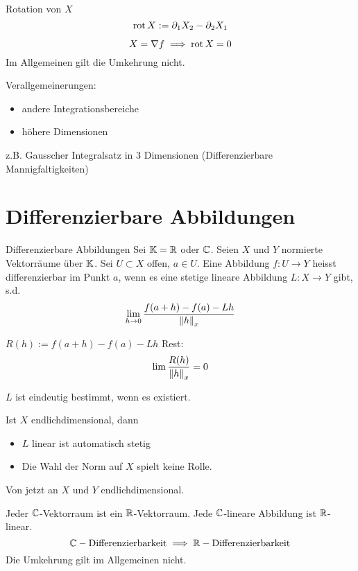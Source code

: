 \begin{Def}{Rotation von $X$}
  \[\operatorname{rot} X:=\partial_1X_2-\partial_2X_1\]
\end{Def}
\begin{Bem}
  \[X=\nabla f\implies \operatorname{rot} X=0\]
  Im Allgemeinen gilt die Umkehrung nicht.
\end{Bem}
\begin{Bem}
  Verallgemeinerungen:
  \begin{itemize}
    \item andere Integrationsbereiche
    \item höhere Dimensionen
  \end{itemize}
  z.B. Gausscher Integralsatz in 3 Dimensionen (Differenzierbare Mannigfaltigkeiten)
\end{Bem}
\section{Differenzierbare Abbildungen}
\begin{Def}{Differenzierbare Abbildungen}
  Sei $\mathbb{K}=\mathbb{R}$ oder $\mathbb{C}$. Seien $X$ und $Y$ normierte Vektorräume über $\mathbb{K}$. Sei $U\subset X$ offen, $a\in U$. Eine Abbildung $f:U\to Y$ heisst differenzierbar im Punkt $a$, wenn es eine stetige lineare Abbildung $L:X\to Y$ gibt, s.d.
  \[\displaystyle\lim_{h\rightarrow0}\frac{f(a+h)-f(a)-Lh}{\left\| h \right\|_x}\]
\end{Def}
\begin{Bem}
  $R(h):=f(a+h)-f(a)-Lh$ Rest:
  \[\lim\frac{R(h)}{\left\| h \right\|_x}=0\]
\end{Bem}
\begin{Bem}
  $L$ ist eindeutig bestimmt, wenn es existiert.
\end{Bem}
\begin{Bem}
  Ist $X$ endlichdimensional, dann
  \begin{itemize}
    \item $L$ linear ist automatisch stetig
    \item Die Wahl der Norm auf $X$ spielt keine Rolle.
  \end{itemize}
\end{Bem}
\begin{Bem}
  Von jetzt an $X$ und $Y$ endlichdimensional.
\end{Bem}
\begin{Bem}
  Jeder $\mathbb{C}$-Vektorraum ist ein $\mathbb{R}$-Vektorraum. Jede $\mathbb{C}$-lineare Abbildung ist $\mathbb{R}$-linear. 
  \[\mathbb{C}-\text{Differenzierbarkeit}\implies\mathbb{R}-\text{Differenzierbarkeit}\]
  Die Umkehrung gilt im Allgemeinen nicht.
\end{Bem}
